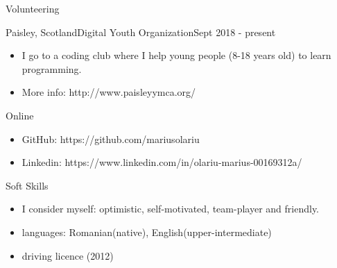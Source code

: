 \documentclass[]{mcdowellcv}
\begin{document}
	\begin{cvsection}{Volunteering}
		\begin{cvsubsection}{Paisley, Scotland}{Digital Youth Organization}{Sept 2018 - present}
			\begin{itemize}
				\item I go to a coding club where I help young people (8-18 years old) to learn programming. 
				\item More info: http://www.paisleyymca.org/
			\end{itemize}
		\end{cvsubsection}
	\end{cvsection}

	\begin{cvsection}{Online}
		\begin{cvsubsection}{}{}{}
			\begin{itemize}
				\item GitHub: https://github.com/mariusolariu
				\item Linkedin: https://www.linkedin.com/in/olariu-marius-00169312a/
			\end{itemize}
		\end{cvsubsection}
	\end{cvsection}

	\begin{cvsection}{Soft Skills}
		\begin{cvsubsection}{}{}{}
			\begin{itemize}
				\item I consider myself: optimistic, self-motivated, team-player and friendly.
				\item languages: Romanian(native), English(upper-intermediate)
				\item driving licence (2012)
			\end{itemize}
		\end{cvsubsection}
	\end{cvsection}
	
\end{document}
